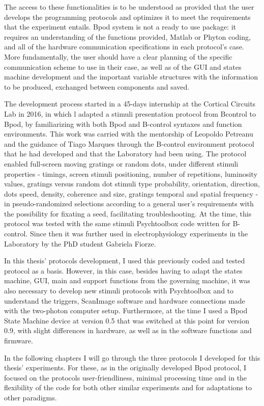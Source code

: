 The access to these functionalities is to be understood as provided that the user develops the programming protocols and optimizes it to meet the requirements that the experiment entails. Bpod system is not a ready to use package: it requires an understanding of the functions provided, Matlab or Phyton coding, and all of the hardware communication specifications in each protocol's case. More fundamentally, the user should have a clear planning of the specific communication scheme to use in their case, as well as of the GUI and states machine development and the important variable structures with the information to be produced, exchanged between components and saved. 

The development process started in a 45-days internship at the Cortical Circuits Lab in 2016, in which l adapted a stimuli presentation protocol from Bcontrol to Bpod, by familiarizing with both Bpod and B-control syntaxes and function environments. This work was carried with the mentorship of Leopoldo Petreanu and the guidance of Tiago Marques through the B-control environment protocol that he had developed and that the Laboratory had been using. The protocol enabled full-screen moving gratings or random dots, under different stimuli properties - timings, screen stimuli positioning, number of repetitions, luminosity values, gratings versus random dot stimuli type probability, orientation, direction, dots speed, density, coherence and size, gratings temporal and spatial frequency - in pseudo-randomized selections according to a general user's requirements with the possibility for fixating a seed, facilitating troubleshooting. At the time, this protocol was tested with the same stimuli Psychtoolbox code written for B-control. Since then it was further used in electrophysiology experiments in the Laboratory by the PhD student Gabriela Fiorze.

In this thesis' protocols development, I used  this previously coded and tested protocol as a basis. However, in this case, besides having to adapt the states machine, GUI, main and support functions from the governing machine, it was also necessary to develop new stimuli protocols with Psychtoolbox  and to understand the triggers, ScanImage software and hardware connections made with the two-photon computer setup. Furthermore, at the time I used a Bpod State Machine device at version 0.5 that was switched at this point for version 0.9, with slight differences in hardware, as well as in the software functions and firmware.

In the following chapters I will go through the three protocols I developed for this thesis' experiments. For these, as in the originally developed Bpod protocol, I focused on the protocols user-friendliness, minimal processing time and in the flexibility of the code for both other similar experiments and for adaptations to other paradigms.

